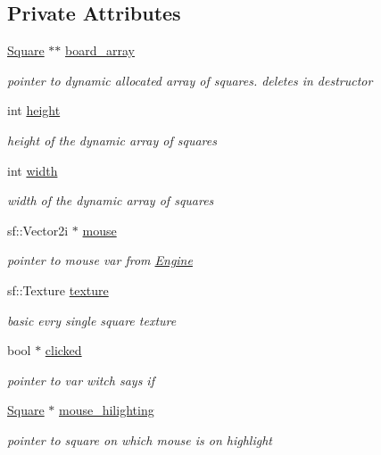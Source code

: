 \subsection*{Private Attributes}
\begin{DoxyCompactItemize}
\item 
\hyperlink{class_square}{Square} $\ast$$\ast$ \hyperlink{class_board_aae4209ee856592868709d92081368777}{board\+\_\+array}
\begin{DoxyCompactList}\small\item\em pointer to dynamic allocated array of squares. deletes in destructor \end{DoxyCompactList}\item 
int \hyperlink{class_board_aa0cb8de0254520dc08dab5796643c8e5}{height}
\begin{DoxyCompactList}\small\item\em height of the dynamic array of squares \end{DoxyCompactList}\item 
int \hyperlink{class_board_a90a8efaa4736af25511ac948bdd27d6c}{width}
\begin{DoxyCompactList}\small\item\em width of the dynamic array of squares \end{DoxyCompactList}\item 
sf\+::\+Vector2i $\ast$ \hyperlink{class_board_a70eb26b4e2928c9eb58f9072380ced54}{mouse}
\begin{DoxyCompactList}\small\item\em pointer to mouse var from \hyperlink{class_engine}{Engine} \end{DoxyCompactList}\item 
sf\+::\+Texture \hyperlink{class_board_a34d04abd4e0c5212e5a32cdd39263298}{texture}
\begin{DoxyCompactList}\small\item\em basic evry single square texture \end{DoxyCompactList}\item 
bool $\ast$ \hyperlink{class_board_adbf08097362eabd4621b777261c2e4d7}{clicked}
\begin{DoxyCompactList}\small\item\em pointer to var witch says if \end{DoxyCompactList}\item 
\hyperlink{class_square}{Square} $\ast$ \hyperlink{class_board_a27c871bcf6b8eb8bb8af2f28a4c7a909}{mouse\+\_\+hilighting}
\begin{DoxyCompactList}\small\item\em pointer to square on which mouse is on highlight \end{DoxyCompactList}\end{DoxyCompactItemize}



